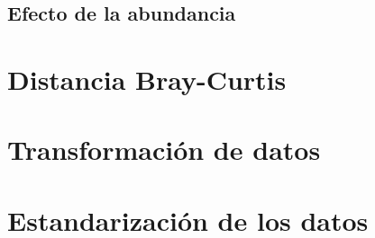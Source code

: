 \documentclass[
]{book}
\begin{document}
\hypertarget{efecto-de-la-abundancia}{%
\subsection{Efecto de la abundancia}\label{efecto-de-la-abundancia}}

\hypertarget{distancia-bray-curtis}{%
\section{Distancia Bray-Curtis}\label{distancia-bray-curtis}}

\hypertarget{transformaciuxf3n-de-datos}{%
\section{Transformación de datos}\label{transformaciuxf3n-de-datos}}

\hypertarget{estandarizaciuxf3n-de-los-datos}{%
\section{Estandarización de los datos}\label{estandarizaciuxf3n-de-los-datos}}

  
\end{document}
